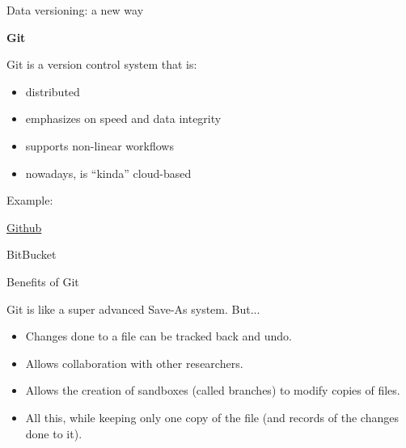 \documentclass{beamer}
\begin{document}
\begin{frame}{Data versioning: a new way}

  {\Large \textbf {Git}}
  
  Git is a version control system that is:
  
  \begin{itemize}
  
    \item distributed
    \item emphasizes on speed and data integrity
    \item supports non-linear workflows
    \item nowadays, is ``kinda'' cloud-based 
  
  \end{itemize}
  
  Example:

    \href{https://github.com/sevragorgia/Statistics}{Github}
    
    BitBucket
    
\end{frame}

\begin{frame}{Benefits of Git}

  Git is like a super advanced Save-As system. But...

  \pause

\begin{itemize}

  \item Changes done to a file can be tracked back and undo.
  
  \pause
  
  \item Allows collaboration with other researchers.
  
  \pause
  
  \item Allows the creation of sandboxes (called branches) to modify copies of files.
  
  \pause
  
  \item All this, while keeping only one copy of the file (and records of the changes done to it).

\end{itemize}

\end{frame}
\end{document}
